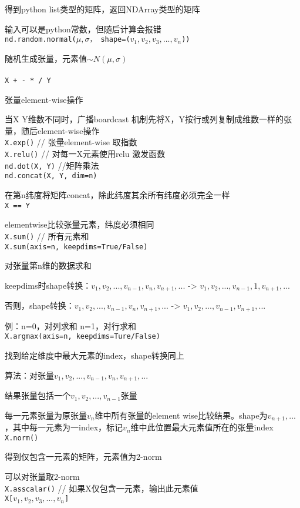 \documentclass[UTF8]{ctexart}
\begin{document}
  得到python list类型的矩阵，返回NDArray类型的矩阵
  
  输入可以是python常数，但随后计算会报错\\
\texttt{nd.random.normal($\mu, \sigma$， shape=($v_1, v_2, v_3, ..., v_n$))}

  随机生成张量，元素值$\sim N(\mu, \sigma)$\\\\
\texttt{X + - * / Y}

  张量element-wise操作
  
  当X Y维数不同时，广播boardcast 机制先将X，Y按行或列复制成维数一样的张量，随后element-wise操作\\
\texttt{X.exp()} // 张量element-wise 取指数\\
\texttt{X.relu()} // 对每一X元素使用relu 激发函数\\
\texttt{nd.dot(X, Y)} //矩阵乘法\\
\texttt{nd.concat(X, Y, dim=n)}

  在第n纬度将矩阵concat，除此纬度其余所有纬度必须完全一样\\
\texttt{X == Y} 

  elementwise比较张量元素，纬度必须相同\\
\texttt{X.sum()} // 所有元素和\\
\texttt{X.sum(axis=n, keepdims=True/False)}

  对张量第n维的数据求和
  
  keepdims时shape转换：$v_1, v_2, ..., v_{n-1}, v_n, v_{n+1}, ...$ -> $v_1, v_2, ..., v_{n-1}, 1, v_{n+1}, ...$

  否则，shape转换：$v_1, v_2, ..., v_{n-1}, v_n, v_{n+1}, ...$ -> $v_1, v_2, ..., v_{n-1}, v_{n+1}, ...$

  例：n=0，对列求和 n=1，对行求和\\
\texttt{X.argmax(axis=n, keepdims=Ture/False)}
  
  找到给定维度中最大元素的index，shape转换同上

  算法：对张量$v_1, v_2, ..., v_{n-1}, v_n, v_{n+1}, ...$

  \quad 结果张量包括一个$v_1, v_2, ..., v_{n-1}$张量

  \quad 每一元素张量为原张量$v_n$维中所有张量的element wise比较结果。shape为$v_{n+1}, ...$，其中每一元素为一index，标记$v_n$维中此位置最大元素值所在的张量index\\
\texttt{X.norm()}
 
  得到仅包含一元素的矩阵，元素值为2-norm

  可以对张量取2-norm\\
\texttt{X.asscalar()} // 如果X仅包含一元素，输出此元素值\\
\texttt{X[$v_1, v_2, v_3, ..., v_n$]}
\end{document}
